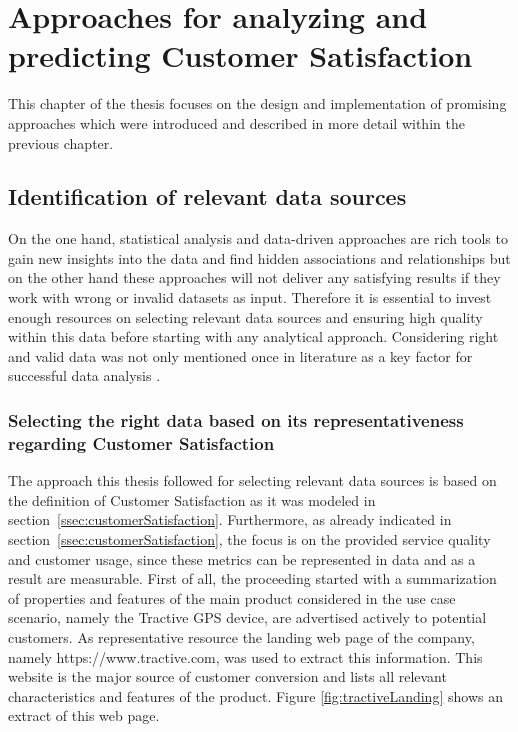 \chapter{Approaches for analyzing and predicting Customer Satisfaction}
\label{ch:implementation}

This chapter of the thesis focuses on the design and implementation of promising approaches which were introduced and described in more detail within the previous chapter. 

\section{Identification of relevant data sources}
\label{sec:dataSources}

On the one hand, statistical analysis and data-driven approaches are rich tools to gain new insights into the data and find hidden associations and relationships but on the other hand these approaches will not deliver any satisfying results if they work with wrong or invalid datasets as input. Therefore it is essential to invest enough resources on selecting relevant data sources and ensuring high quality within this data before starting with any analytical approach. Considering right and valid data was not only mentioned once in literature as a key factor for successful data analysis \cite{neckel2015}. 

\subsection{Selecting the right data based on its representativeness regarding Customer Satisfaction}

The approach this thesis followed for selecting relevant data sources is based on the definition of Customer Satisfaction as it was modeled in section~\ref{ssec:customerSatisfaction}. Furthermore, as already indicated in section~\ref{ssec:customerSatisfaction}, the focus is on the provided service quality and customer usage, since these metrics can be represented in data and as a result are measurable. First of all, the proceeding started with a summarization of properties and features of the main product considered in the use case scenario, namely the Tractive GPS device, are advertised actively to potential customers. As representative resource the landing web page of the company, namely https://www.tractive.com, was used to extract this information. This website is the major source of customer conversion  and lists all relevant characteristics and features of the product. Figure \ref{fig:tractiveLanding} shows an extract of this web page.

